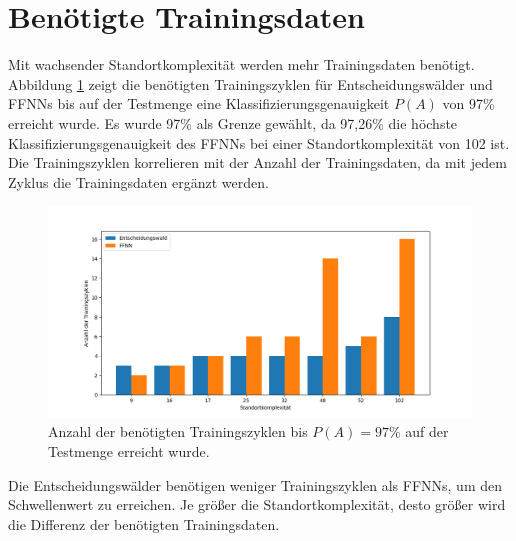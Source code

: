 \section{Benötigte Trainingsdaten}
Mit wachsender Standortkomplexität werden mehr Trainingsdaten benötigt.
Abbildung \ref{fig:required_training_data} zeigt die benötigten Trainingszyklen für Entscheidungswälder und FFNNs bis auf der Testmenge
eine Klassifizierungsgenauigkeit $P(A)$ von 97\% erreicht wurde.
Es wurde 97\% als Grenze gewählt, da 97,26\% die höchste Klassifizierungsgenauigkeit des FFNNs bei einer Standortkomplexität von 102 ist.
Die Trainingszyklen korrelieren mit der Anzahl der Trainingsdaten, da mit jedem Zyklus die Trainingsdaten ergänzt werden.
\begin{figure}[h!]
    \centering
    \includegraphics[width=\linewidth]{images/required_training_data.png}
    \caption{Anzahl der benötigten Trainingszyklen bis $P(A)=97\%$ auf der Testmenge erreicht wurde. }
    \label{fig:required_training_data}
\end{figure}
\newline
\newline
Die Entscheidungswälder benötigen weniger Trainingszyklen als FFNNs, um den Schwellenwert zu erreichen.
Je größer die Standortkomplexität, desto größer wird die Differenz der benötigten Trainingsdaten.